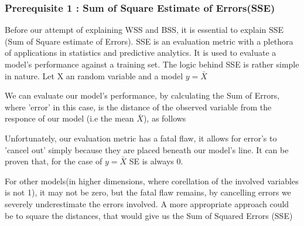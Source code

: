 \documentclass[11pt]{article}
\begin{document}
			\subsubsection*{Prerequisite 1 : Sum of Square Estimate of Errors(SSE)}
				Before our attempt of explaining WSS and BSS, it is essential to explain SSE (Sum of Square estimate of Errors). SSE is an evaluation metric with a plethora of applications in statistics and predictive analytics\cite{???}. It is used to evaluate a model's performance against a training set\cite{???}. The logic behind SSE is rather simple in nature. Let X an random variable and a model $y=\bar{X}$

				We can evaluate our model's performance, by calculating the Sum of Errors, where 'error' in this case, is the distance of the observed variable from the responce of our model (i.e the mean $\bar{X}$), as follows

				Unfortunately, our evaluation metric has a fatal flaw, it allows for error's to 'cancel out' simply because they are placed beneath our model's line. It can be proven that, for the case of $y=\bar{X}$ SE is always 0.

				For other models(in higher dimensions, where corellation of the involved variables is not 1), it may not be zero, but the fatal flaw remains, by cancelling errors we severely underestimate the errors involved. A more appropriate approach could be to square the distances, that would give us the Sum of Squared Errors (SSE)\\

\end{document}
